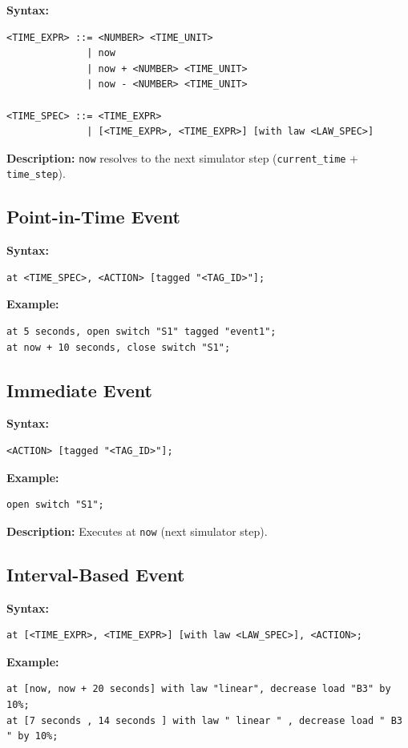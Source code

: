 \documentclass[12pt]{article}
\begin{document}
\textbf{Syntax:}
\begin{lstlisting}
<TIME_EXPR> ::= <NUMBER> <TIME_UNIT>
              | now
              | now + <NUMBER> <TIME_UNIT>
              | now - <NUMBER> <TIME_UNIT>

<TIME_SPEC> ::= <TIME_EXPR>
              | [<TIME_EXPR>, <TIME_EXPR>] [with law <LAW_SPEC>]
\end{lstlisting}

\textbf{Description:} \texttt{now} resolves to the next simulator step (\texttt{current\_time} +
\texttt{time\_step}).

\subsection{Point-in-Time Event}

\textbf{Syntax:}
\begin{lstlisting}
at <TIME_SPEC>, <ACTION> [tagged "<TAG_ID>"];
\end{lstlisting}

\textbf{Example:}
\begin{lstlisting}
at 5 seconds, open switch "S1" tagged "event1";
at now + 10 seconds, close switch "S1";
\end{lstlisting}

\subsection{Immediate Event}

\textbf{Syntax:}
\begin{lstlisting}
<ACTION> [tagged "<TAG_ID>"];
\end{lstlisting}

\textbf{Example:}
\begin{lstlisting}
open switch "S1";
\end{lstlisting}

\textbf{Description:} Executes at \texttt{now} (next simulator step).

\subsection{Interval-Based Event}

\textbf{Syntax:}
\begin{lstlisting}
at [<TIME_EXPR>, <TIME_EXPR>] [with law <LAW_SPEC>], <ACTION>;
\end{lstlisting}

\textbf{Example:}
\begin{lstlisting}
at [now, now + 20 seconds] with law "linear", decrease load "B3" by 10%;
at [7 seconds , 14 seconds ] with law " linear " , decrease load " B3 " by 10%;
\end{lstlisting}
\end{document}
